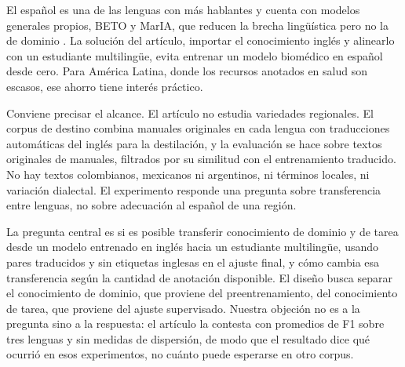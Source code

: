 El español es una de las lenguas con más hablantes y cuenta con modelos generales propios, BETO y MarIA, que reducen la brecha lingüística pero no la de dominio \cite{canete2020,gutierrez2022}. La solución del artículo, importar el conocimiento inglés y alinearlo con un estudiante multilingüe, evita entrenar un modelo biomédico en español desde cero. Para América Latina, donde los recursos anotados en salud son escasos, ese ahorro tiene interés práctico.

Conviene precisar el alcance. El artículo no estudia variedades regionales. El corpus de destino combina manuales originales en cada lengua con traducciones automáticas del inglés para la destilación, y la evaluación se hace sobre textos originales de manuales, filtrados por su similitud con el entrenamiento traducido. No hay textos colombianos, mexicanos ni argentinos, ni términos locales, ni variación dialectal. El experimento responde una pregunta sobre transferencia entre lenguas, no sobre adecuación al español de una región.

La pregunta central es si es posible transferir conocimiento de dominio y de tarea desde un modelo entrenado en inglés hacia un estudiante multilingüe, usando pares traducidos y sin etiquetas inglesas en el ajuste final, y cómo cambia esa transferencia según la cantidad de anotación disponible. El diseño busca separar el conocimiento de dominio, que proviene del preentrenamiento, del conocimiento de tarea, que proviene del ajuste supervisado. Nuestra objeción no es a la pregunta sino a la respuesta: el artículo la contesta con promedios de F1 sobre tres lenguas y sin medidas de dispersión, de modo que el resultado dice qué ocurrió en esos experimentos, no cuánto puede esperarse en otro corpus.
